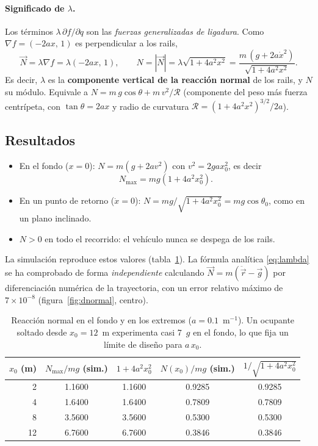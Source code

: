 \documentclass[11pt,a4paper]{article}
\begin{document}
\paragraph{Significado de $\lambda$.} Los términos $\lambda\,\partial f/\partial q$ son las \emph{fuerzas generalizadas de ligadura}. Como
$\nabla f=(-2ax,\,1)$ es perpendicular a los rails,
\begin{equation}
 \vec N=\lambda\nabla f=\lambda(-2ax,\,1),\qquad N=|\vec N|=\lambda\sqrt{1+4a^2x^2}=\frac{m\,(g+2a\dot x^2)}{\sqrt{1+4a^2x^2}}.
\end{equation}
Es decir, $\lambda$ es la \textbf{componente vertical de la reacción normal} de los rails, y $N$ su módulo. Equivale a $N=m\,g\cos\theta+m\,v^2/\mathcal R$ (componente del peso más fuerza centrípeta, con $\tan\theta=2ax$ y radio de curvatura $\mathcal R=(1+4a^2x^2)^{3/2}/2a$).

\subsection{Resultados}
\begin{itemize}[leftmargin=*]
 \item En el fondo ($x=0$): $N=m(g+2av^2)$ con $v^2=2gax_0^2$, es decir
 \begin{equation}
  N_{\max}=mg\left(1+4a^2x_0^2\right).
 \end{equation}
 \item En un punto de retorno ($\dot x=0$): $N=mg/\sqrt{1+4a^2x_0^2}=mg\cos\theta_0$, como en un plano inclinado.
 \item $N>0$ en todo el recorrido: el vehículo nunca se despega de los rails.
\end{itemize}
La simulación reproduce estos valores (tabla~\ref{tab:d}). La fórmula analítica \eqref{eq:lambda} se ha comprobado de forma \emph{independiente} calculando
$\vec N=m(\ddot{\vec r}-\vec g)$ por diferenciación numérica de la trayectoria, con un error relativo máximo de $7\times10^{-8}$ (figura~\ref{fig:dnormal}, centro).

\begin{table}[ht]\centering
\begin{tabular}{rcccc}
\toprule
$x_0$ (m) & $N_{\max}/mg$ (sim.) & $1+4a^2x_0^2$ & $N(x_0)/mg$ (sim.) & $1/\sqrt{1+4a^2x_0^2}$ \\
\midrule
2 & 1.1600 & 1.1600 & 0.9285 & 0.9285\\
4 & 1.6400 & 1.6400 & 0.7809 & 0.7809\\
8 & 3.5600 & 3.5600 & 0.5300 & 0.5300\\
12 & 6.7600 & 6.7600 & 0.3846 & 0.3846\\
\bottomrule
\end{tabular}
\caption{Reacción normal en el fondo y en los extremos ($a=0.1$~m$^{-1}$). Un ocupante soltado desde $x_0=12$~m experimenta casi 7~$g$ en el fondo,
lo que fija un límite de diseño para $a\,x_0$.}\label{tab:d}
\end{table}
\end{document}
